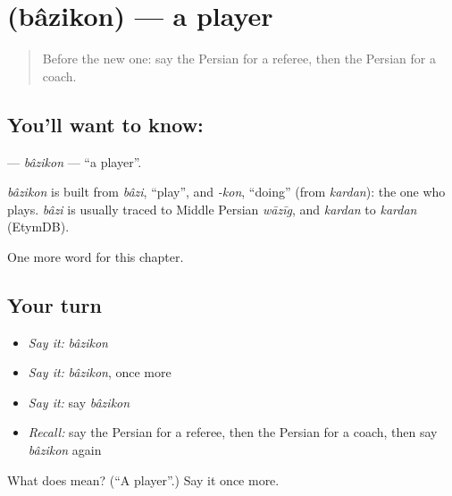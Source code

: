 \section[\texorpdfstring{\fa{بازیکن} (bâzikon)}{بازیکن (bâzikon)}]{ (bâzikon) — a player}

\label{lesson:FA-C251-bazikon}



\begin{quote}
Before the new one: say the Persian for a referee, then the Persian for a coach.
\end{quote}

\subsection*{You'll want to know: }
\textbf{} — \emph{bâzikon} — \textquotedblleft{}a player\textquotedblright{}.

\begin{cousinweb}
\emph{bâzikon} is built from \emph{bâzi}, \textquotedblleft{}play\textquotedblright{}, and \emph{-kon}, \textquotedblleft{}doing\textquotedblright{} (from \emph{kardan}): the one who plays. \emph{bâzi} is usually traced to Middle Persian \emph{wāzīg}, and \emph{kardan} to \emph{kardan} (EtymDB).
\end{cousinweb}

\begin{grammarlens}[title={What you've built}]
One more word for this chapter.
\end{grammarlens}

\subsection*{Your turn}
\begin{itemize}
\raggedright
  \item \emph{Say it:} \emph{bâzikon}
  \item \emph{Say it:} \emph{bâzikon}, once more
  \item \emph{Say it:} say \emph{bâzikon}
  \item \emph{Recall:} say the Persian for a referee, then the Persian for a coach, then say \emph{bâzikon} again
\end{itemize}

\begin{tcolorbox}[breakable,colback=teal!4,colframe=teal!35!black,title={Before you move on}]
What does  mean? (\textquotedblleft{}A player\textquotedblright{}.) Say it once more.
\end{tcolorbox}

